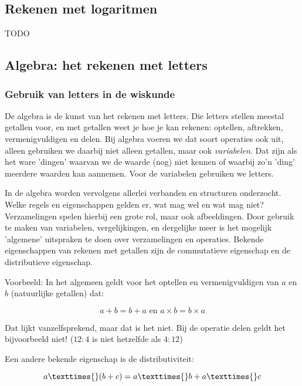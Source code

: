 \subsection{Rekenen met logaritmen}
TODO

\subsection{Algebra: het rekenen met letters}


\subsubsection{Gebruik van letters in de wiskunde}

De algebra is de kunst van het rekenen met letters. Die letters stellen
meestal getallen voor, en met getallen weet je hoe je kan rekenen:
optellen, aftrekken, vermenigvuldigen en delen. Bij algebra voeren
we dat soort operaties ook uit, alleen gebruiken we daarbij niet alleen
getallen, maar ook \emph{variabelen}. Dat zijn als het ware 'dingen'
waarvan we de waarde (nog) niet kennen of waarbij zo'n 'ding' meerdere
waarden kan aannemen. Voor de variabelen gebruiken we letters.

\noindent In de algebra worden vervolgens allerlei verbanden en structuren
onderzocht. Welke regels en eigenschappen gelden er, wat mag wel en
wat mag niet? Verzamelingen spelen hierbij een grote rol, maar ook
afbeeldingen. Door gebruik te maken van variabelen, vergelijkingen,
en dergelijke meer is het mogelijk 'algemene' uitspraken te doen over
verzamelingen en operaties. Bekende eigenschappen van rekenen met
getallen zijn de commutatieve eigenschap en de distributieve eigenschap.

\medskip{}

Voorbeeld: In het algemeen geldt voor het optellen en vermenigvuldigen
van $a$ en $b$ (natuurlijke getallen) dat:

\begin{equation*}
a + b = b + a \text{ en } a \times{} b = b \times{} a
\end{equation*}

Dat lijkt vanzelfsprekend, maar dat is het niet. Bij de operatie delen
geldt het bijvoorbeeld niet! ($12:4$ is niet hetzelfde als $4:12$)

\medskip{}

Een andere bekende eigenschap is de distributiviteit:

\begin{equation*}
a \texttimes{} (b + c) = a \texttimes{} b + a \texttimes{} c
\end{equation*}

